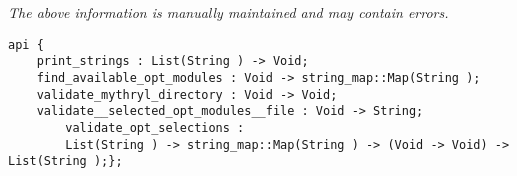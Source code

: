 \label{api:Opt\_Junk}

{\tiny \it The above information is manually maintained and may contain errors.}
\begin{verbatim}
api {
    print_strings : List(String ) -> Void;
    find_available_opt_modules : Void -> string_map::Map(String );
    validate_mythryl_directory : Void -> Void;
    validate__selected_opt_modules__file : Void -> String;
        validate_opt_selections :
        List(String ) -> string_map::Map(String ) -> (Void -> Void) -> List(String );};
\end{verbatim}
